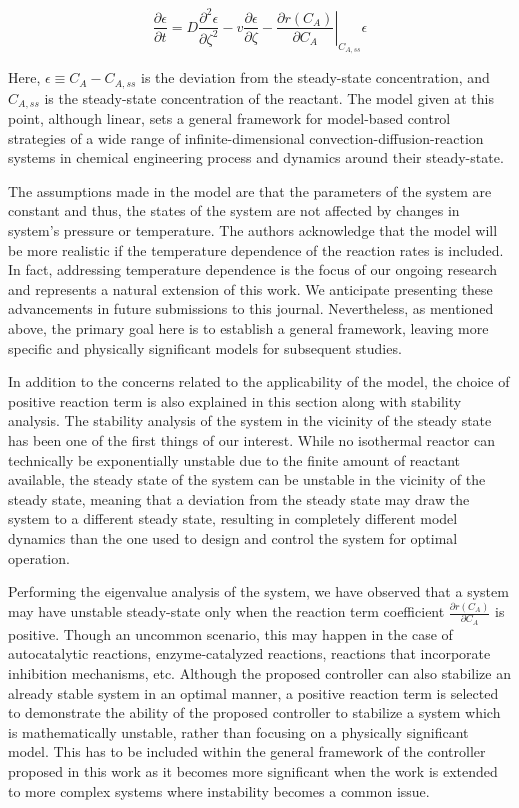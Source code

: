 \documentclass[12pt,answers]{exam}
\begin{document}
\begin{equation}
    \frac{\partial \epsilon}{\partial t} = D \frac{\partial^2 \epsilon}{\partial \zeta^2} - v \frac{\partial \epsilon}{\partial \zeta} - \left. \frac{\partial r(C_A)}{\partial C_A} \right|_{C_{A, ss}} \epsilon
\end{equation}

Here, $\epsilon \equiv C_A - C_{A, ss}$ is the deviation from the steady-state concentration, and $C_{A, ss}$ is the steady-state concentration of the reactant. The model given at this point, although linear, sets a general framework for model-based control strategies of a wide range of infinite-dimensional convection-diffusion-reaction systems in chemical engineering process and dynamics around their steady-state.

The assumptions made in the model are that the parameters of the system are constant and thus, the states of the system are not affected by changes in system's pressure or temperature. The authors acknowledge that the model will be more realistic if the temperature dependence of the reaction rates is included. In fact, addressing temperature dependence is the focus of our ongoing research and represents a natural extension of this work. We anticipate presenting these advancements in future submissions to this journal. Nevertheless, as mentioned above, the primary goal here is to establish a general framework, leaving more specific and physically significant models for subsequent studies.

In addition to the concerns related to the applicability of the model, the choice of positive reaction term is also explained in this section along with stability analysis. The stability analysis of the system in the vicinity of the steady state has been one of the first things of our interest. While no isothermal reactor can technically be exponentially unstable due to the finite amount of reactant available, the steady state of the system can be unstable in the vicinity of the steady state, meaning that a deviation from the steady state may draw the system to a different steady state, resulting in completely different model dynamics than the one used to design and control the system for optimal operation.

Performing the eigenvalue analysis of the system, we have observed that a system may have unstable steady-state only when the reaction term coefficient $\frac{\partial r(C_A)}{\partial C_A}$ is positive. Though an uncommon scenario, this may happen in the case of autocatalytic reactions, enzyme-catalyzed reactions, reactions that incorporate inhibition mechanisms, etc. Although the proposed controller can also stabilize an already stable system in an optimal manner, a positive reaction term is selected to demonstrate the ability of the proposed controller to stabilize a system which is mathematically unstable, rather than focusing on a physically significant model. This has to be included within the general framework of the controller proposed in this work as it becomes more significant when the work is extended to more complex systems where instability becomes a common issue.
\end{document}
